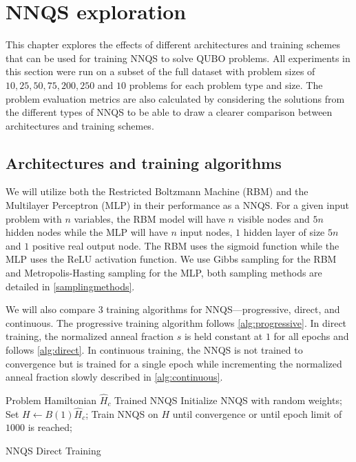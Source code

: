 \chapter{NNQS exploration}\label{nnqsresults}
This chapter explores the effects of different architectures and training schemes that can be used for training NNQS to solve QUBO problems. All experiments in this section were run on a subset of the full dataset with problem sizes of $10,25,50,75,200,250$ and $10$ problems for each problem type and size. The problem evaluation metrics are also calculated by considering the solutions from the different types of NNQS to be able to draw a clearer comparison between architectures and training schemes.

\section{Architectures and training algorithms}
We will utilize both the Restricted Boltzmann Machine (RBM) and the Multilayer Perceptron (MLP) in their performance as a NNQS. For a given input problem with $n$ variables, the RBM model will have $n$ visible nodes and $5n$ hidden nodes while the MLP will have $n$ input nodes, $1$ hidden layer of size $5n$ and $1$ positive real output node. The RBM uses the sigmoid function while the MLP uses the ReLU activation function. We use Gibbs sampling for the RBM and Metropolis-Hasting sampling for the MLP, both sampling methods are detailed in \autoref{samplingmethods}.

We will also compare 3 training algorithms for NNQS---progressive, direct, and continuous. The progressive training algorithm follows \autoref{alg:progressive}. In direct training, the normalized anneal fraction $s$ is held constant at $1$ for all epochs and follows \autoref{alg:direct}.  In continuous training, the NNQS is not trained to convergence but is trained for a single epoch while incrementing the normalized anneal fraction slowly described in \autoref{alg:continuous}.

\begin{algorithm}
    \begin{algorithmic}
    \Require Problem Hamiltonian $\hat{H}_c$
    \Ensure Trained NNQS
    \State Initialize NNQS with random weights;
    \State Set $H \leftarrow B(1)\hat{H}_c$;
    \State Train NNQS on $H$ until convergence or until epoch limit of $1000$ is reached;
    \end{algorithmic}
    \caption{NNQS Direct Training}
    \label{alg:direct}
\end{algorithm}

